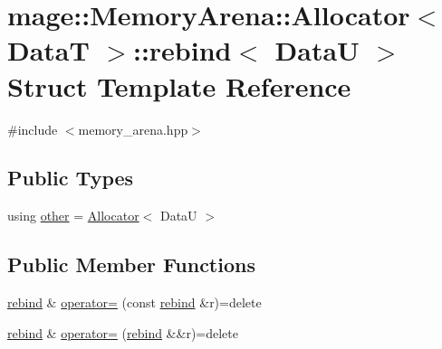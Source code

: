 \hypertarget{structmage_1_1_memory_arena_1_1_allocator_1_1rebind}{}\section{mage\+:\+:Memory\+Arena\+:\+:Allocator$<$ DataT $>$\+:\+:rebind$<$ DataU $>$ Struct Template Reference}
\label{structmage_1_1_memory_arena_1_1_allocator_1_1rebind}


{\ttfamily \#include $<$memory\+\_\+arena.\+hpp$>$}

\subsection*{Public Types}
\begin{DoxyCompactItemize}
\item 
using \hyperlink{structmage_1_1_memory_arena_1_1_allocator_1_1rebind_aad55bf384b9a95ae1c2158f1d2afe180}{other} = \hyperlink{structmage_1_1_memory_arena_1_1_allocator}{Allocator}$<$ DataU $>$
\end{DoxyCompactItemize}
\subsection*{Public Member Functions}
\begin{DoxyCompactItemize}
\item 
\hyperlink{structmage_1_1_memory_arena_1_1_allocator_1_1rebind}{rebind} \& \hyperlink{structmage_1_1_memory_arena_1_1_allocator_1_1rebind_abfd04d5a32b3e059168969ee9531fa40}{operator=} (const \hyperlink{structmage_1_1_memory_arena_1_1_allocator_1_1rebind}{rebind} \&r)=delete
\item 
\hyperlink{structmage_1_1_memory_arena_1_1_allocator_1_1rebind}{rebind} \& \hyperlink{structmage_1_1_memory_arena_1_1_allocator_1_1rebind_a3c0ea6bf80d7b64144021d710d6c1b01}{operator=} (\hyperlink{structmage_1_1_memory_arena_1_1_allocator_1_1rebind}{rebind} \&\&r)=delete
\end{DoxyCompactItemize}
